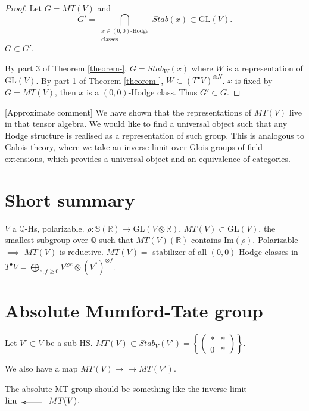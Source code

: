 \begin{proof}
Let $G=MT(V)$ and
$$
G'=\bigcap_{\substack{x \in
(0,0)\text{-Hodge}\\\text{classes}}}Stab(x)
\subset \text{GL}(V).
$$
$G \subset G'$.

By part 3 of Theorem \ref{theorem-},
$G=Stab_W(x)$ where $W$ is a representation
of $\text{GL}(V)$.
By part 1 of Theorem \ref{theorem-},
$W \subset (T^\bullet V)^{\oplus N}$.
$x$ is fixed by $G=MT(V)$,
then  $x$ is a $(0,0)$-Hodge class.
Thus $G' \subset G$.
\end{proof}

\noindent

[Approximate comment]
We have shown that the representations of
$MT(V)$
live in that tensor algebra.
We would like to find a universal object
such that any Hodge structure is realised as
a
representation of such group.
This is analogous to Galois theory,
where we take an inverse limit over Glois
groups
of field extensions,
which provides a universal object and
an equivalence of categories.

\section{Short summary}
\label{section-summary2}

$V$ a $\mathbb{Q}$-Hs, polarizable.
$\rho:\mathbb{S}(\mathbb{R})\to \text{GL}(V
\otimes \mathbb{R})$,
$MT(V)\subset\text{GL}(V)$, the smallest
subgroup over $\mathbb{Q}$ such that
$MT(V)(\mathbb{R})$ contains
$\text{Im}(\rho)$.
Polarizable $\implies$ $MT(V)$ is reductive.
$MT(V)=$ stabilizer of all $(0,0)$ Hodge
classes
in $T^\bullet V=\bigoplus_{e,f\geq
0}V^{\otimes e}\otimes(V^* )^{\otimes f}$.

\section{Absolute Mumford-Tate group}
\label{section-absolute}

Let $V' \subset V$ be a sub-HS.
$MT(V) \subset
Stab_V(V')=\left\{\begin{pmatrix}\ast&\ast\\
0&\ast\end{pmatrix} \right\} $.

We also have a map
$MT(V) \to\!\!\!\!\!\to MT(V')$.

\medskip\noindent
The absolute MT group should be something
like the inverse limit
$\lim_{\xymatrix{&\ar[l]}}MT(V) $.

